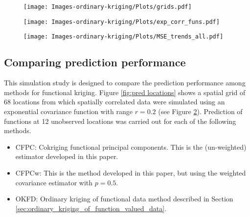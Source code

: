 \begin{figure}[h]
	\begin{center}
		\texttt{[image: Images-ordinary-kriging/Plots/grids.pdf]} 
	\end{center}
	 \label{fig:grid3} 
\end{figure}

\begin{figure}[h]
	\begin{center}
		\texttt{[image: Images-ordinary-kriging/Plots/exp\_corr\_funs.pdf]} 
	\end{center}
	 \label{fig:exp_corr_funs} 
\end{figure}

\begin{figure}[h]
	\begin{center}
		\texttt{[image: Images-ordinary-kriging/Plots/MSE\_trends\_all.pdf]} 
	\end{center}
	 \label{fig:MSE_trends} 
\end{figure}


\subsection{Comparing prediction performance} %
\label{sub:comparing_prediction_performance}
This simulation study is designed to compare the prediction performance among methods for functional kriging. Figure \ref{fig:pred locations} shows a spatial grid of 68 locations from which spatially correlated data were simulated using an exponential covariance function with range $r = 0.2$ (see Figure \ref{fig:exp_corr_funs}). Prediction of functions at 12 unobserved locations was carried out for each of the following methods.
\begin{itemize}
	\item CFPC: Cokriging functional principal components. This is the (un-weighted) estimator developed in this paper.
	\item CFPCw: This is the method developed in this paper, but using the weighted covariance estimator with $p=0.5$.
	\item OKFD: Ordinary kriging of functional data method described in Section \ref{sec:ordinary_kriging_of_function_valued_data}.
\end{itemize}

